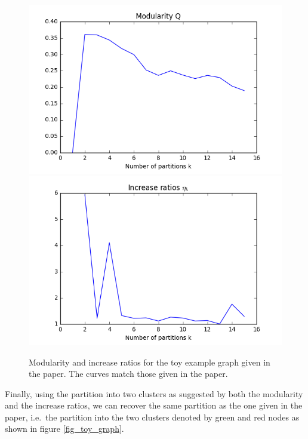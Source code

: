 \documentclass[12pt]{article}
\theoremstyle{definition}
\begin{document}
\begin{figure}
	\includegraphics[scale=0.44]{toy_graph_Q}
	\includegraphics[scale=0.44]{toy_graph_eta}
	\centering
	\caption{Modularity and increase ratios for the toy example graph given in the paper. The curves match those given in the paper.}
	\label{fig_toy_graph_eval}
\end{figure}


Finally, using the partition into two clusters as suggested by both the modularity and the increase ratios, we can recover the same partition as the one given in the paper, i.e.\ the partition into the two clusters denoted by green and red nodes as shown in figure \ref{fig_toy_graph}.
\end{document}
